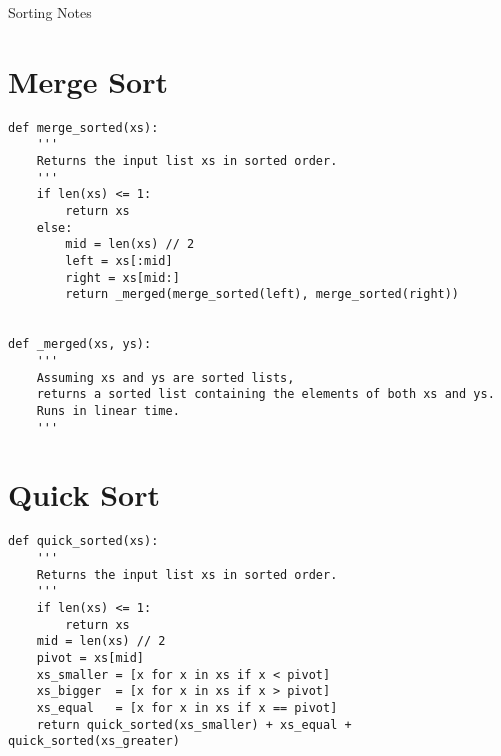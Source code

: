 \documentclass[10pt]{article}
\theoremstyle{definition}
\begin{document}
\begin{center}
    {
\Large
    Sorting Notes
}
\end{center}

\section{Merge Sort}

\begin{lstlisting}
def merge_sorted(xs):
    '''
    Returns the input list xs in sorted order.
    '''
    if len(xs) <= 1:
        return xs
    else:
        mid = len(xs) // 2
        left = xs[:mid]
        right = xs[mid:]
        return _merged(merge_sorted(left), merge_sorted(right))


def _merged(xs, ys):
    '''
    Assuming xs and ys are sorted lists,
    returns a sorted list containing the elements of both xs and ys.
    Runs in linear time.
    '''
\end{lstlisting}

\newpage
\section{Quick Sort}

\begin{lstlisting}
def quick_sorted(xs):
    '''
    Returns the input list xs in sorted order.
    '''
    if len(xs) <= 1:
        return xs
    mid = len(xs) // 2
    pivot = xs[mid]
    xs_smaller = [x for x in xs if x < pivot]
    xs_bigger  = [x for x in xs if x > pivot]
    xs_equal   = [x for x in xs if x == pivot]
    return quick_sorted(xs_smaller) + xs_equal + quick_sorted(xs_greater)
\end{lstlisting}
\end{document}
